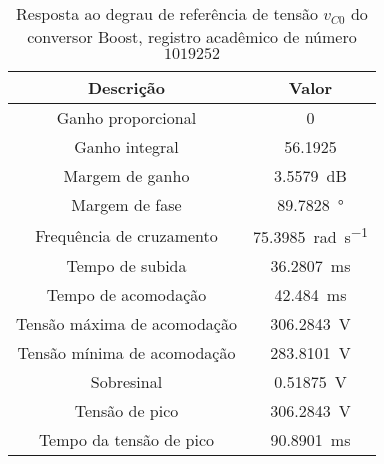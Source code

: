 \begin{table}[!ht]
\centering
\caption{Resposta ao degrau de referência de tensão $v_{C0}$ do conversor Boost, registro acadêmico de número $1019252$}
\label{tab:resposta1malha}
\begin{tabular}{@{}cc@{}}
\toprule
\textbf{Descrição} & \textbf{Valor}\\ \midrule
Ganho proporcional & \SI{0}{}\\
Ganho integral & \SI{56.1925}{}\\
Margem de ganho & \SI{3.5579}{\deci\bel}\\
Margem de fase & \SI{89.7828}{\degree}\\
Frequência de cruzamento & \SI{75.3985}{\radian\per\s}\\
Tempo de subida & \SI{36.2807}{\milli\s}\\
Tempo de acomodação & \SI{42.484}{\milli\s}\\
Tensão máxima de acomodação & \SI{306.2843}{\V}\\
Tensão mínima de acomodação & \SI{283.8101}{\V}\\
Sobresinal & \SI{0.51875}{\V}\\
Tensão de pico & \SI{306.2843}{\V}\\
Tempo da tensão de pico & \SI{90.8901}{\milli\s}\\
\bottomrule
\end{tabular}
\end{table}

